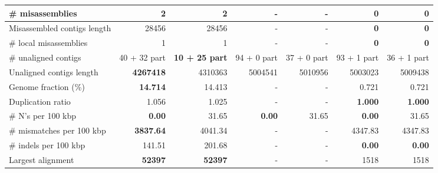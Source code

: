 \documentclass[12pt,a4paper]{article}
\begin{document}
\begin{table}[ht]
\begin{center}
\begin{tabular}{|l*{6}{|r}|}
\# misassemblies & 2 & 2 & - & - & {\bf 0} & {\bf 0} \\ \hline
Misassembled contigs length & 28456 & 28456 & - & - & {\bf 0} & {\bf 0} \\ \hline
\# local misassemblies & 1 & 1 & - & - & {\bf 0} & {\bf 0} \\ \hline
\# unaligned contigs & 40 + 32 part & {\bf 10 + 25 part} & 94 + 0 part & 37 + 0 part & 93 + 1 part & 36 + 1 part \\ \hline
Unaligned contigs length & {\bf 4267418} & 4310363 & 5004541 & 5010956 & 5003023 & 5009438 \\ \hline
Genome fraction (\%) & {\bf 14.714} & 14.413 & - & - & 0.721 & 0.721 \\ \hline
Duplication ratio & 1.056 & 1.025 & - & - & {\bf 1.000} & {\bf 1.000} \\ \hline
\# N's per 100 kbp & {\bf 0.00} & 31.65 & {\bf 0.00} & 31.65 & {\bf 0.00} & 31.65 \\ \hline
\# mismatches per 100 kbp & {\bf 3837.64} & 4041.34 & - & - & 4347.83 & 4347.83 \\ \hline
\# indels per 100 kbp & 141.51 & 201.68 & - & - & {\bf 0.00} & {\bf 0.00} \\ \hline
Largest alignment & {\bf 52397} & {\bf 52397} & - & - & 1518 & 1518 \\ \hline
\end{tabular}
\end{center}
\end{table}
\end{document}
